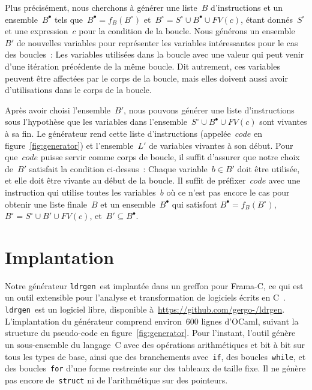 \documentclass[a4paper]{easychair}
\newcommand\ldrgen{\texttt{ldrgen}}
\newcommand{\liveout}[1]{\ensuremath{#1^{\circ}}}
\newcommand{\livein}[1]{\ensuremath{#1^{\bullet}}}
\def\union{\cup}
\begin{document}
Plus précisément, nous cherchons à générer une liste~\(B\) d'instructions et
un ensemble~\(\livein{B}\) tels que~\(\livein{B} = f_B(\liveout{B})\)
et~\(\liveout{B} = \liveout{S} \union \livein{B} \union FV(c)\), étant
donnés~\(\liveout{S}\) et une expression~\(c\) pour la condition de la
boucle. Nous générons un ensemble~\(B'\) de nouvelles variables pour
représenter les variables intéressantes pour le cas des boucles~: Les
variables utilisées dans la boucle avec une valeur qui peut venir d'une
itération précédente de la même boucle. Dit autrement, ces variables peuvent
être affectées par le corps de la boucle, mais elles doivent aussi avoir
d'utilisations dans le corps de la boucle.

Après avoir choisi l'ensemble~\(B'\), nous pouvons générer une liste
d'instructions sous l'hypothèse que les variables dans
l'ensemble~\(\liveout{S} \union \livein{B} \union FV(c)\) sont vivantes à sa
fin. Le générateur rend cette liste d'instructions (appelée~\(code\) en
figure~\ref{fig:generator}) et l'ensemble~\(L'\) de variables vivantes à son
début. Pour que~\(code\) puisse servir comme corps de boucle, il suffit
d'assurer que notre choix de~\(B'\) satisfait la condition ci-dessus~:
Chaque variable~\(b \in B'\) doit être utilisée, et elle doit être vivante
au début de la boucle. Il suffit de préfixer~\(code\) avec une instruction
qui utilise toutes les variables~\(b\) où ce n'est pas encore le cas pour
obtenir une liste finale~\(B\) et un ensemble~\(\livein{B}\) qui satisfont
\(\livein{B} = f_B(\liveout{B})\), \(\liveout{B} = \liveout{S} \union B'
\union FV(c)\), et~\(B' \subseteq \livein{B}\).


\section{Implantation}

Notre générateur \ldrgen\ est implantée dans un greffon pour Frama-C, ce qui
est un outil extensible pour l'analyse et transformation de logiciels écrits
en C~\cite{frama-c}. \ldrgen\ est un logiciel libre, disponible
à~\url{https://github.com/gergo-/ldrgen}. L'implantation du générateur
comprend environ~600 lignes d'OCaml, suivant la structure du pseudo-code en
figure~\ref{fig:generator}. Pour l'instant, l'outil génère un sous-ensemble
du langage~C avec des opérations arithmétiques et bit à bit sur tous les
types de base, ainsi que des branchements avec~\texttt{if}, des
boucles~\texttt{while}, et des boucles~\texttt{for} d'une forme restreinte
sur des tableaux de taille fixe. Il ne génère pas encore de~\texttt{struct}
ni de l'arithmétique sur des pointeurs.
\end{document}
